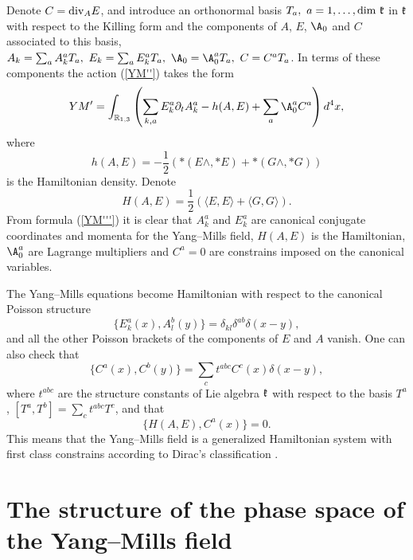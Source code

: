 \documentclass{amsart}
\begin{document}
Denote $C={\rm div}_A E$, and
introduce an orthonormal basis $T_a,~a=1,\ldots ,{\rm dim}~\mathfrak k $ in $\mathfrak k$ with respect to the
Killing form and the components of $A$, $E$, $\A_0$ and $C$ associated to this basis,
$A_k=\sum_a A_k^{a}T_a,~E_k=\sum_a
E_k^{a}T_a,~\A_0=\A_0^{a}T_a,~C=C^{a}T_a$. In terms of these components the
action (\ref{YM''}) takes the form
\begin{equation}\label{YM'''}
YM'=\int_{{\mathbb R}_{1,3}}\left( \sum_{k,a}E_k^{a}\partial_t A_k^{a}-h(A,E)+
\sum_{a}\A_0^{a}C^{a}\right) d^4x,
\end{equation}
where
$$
h(A,E)=-\frac 12 (*(E\wedge,*E)+*(G\wedge,*G))
$$
is the Hamiltonian density. Denote
\begin{equation}\label{hamilt}
H(A,E)=\frac 12 (\langle E,E\rangle +\langle G,G\rangle ).
\end{equation}
From formula (\ref{YM'''}) it is clear that $A_k^{a}$ and $E_k^{a}$ are
canonical conjugate coordinates and momenta for the Yang--Mills field,
$H(A,E)$ is the Hamiltonian, $\A_0^{a}$ are Lagrange multipliers and
$C^a=0$ are constrains imposed on the canonical variables.

The Yang--Mills equations become Hamiltonian with respect to the canonical Poisson
structure
\begin{equation}\label{pois}
  \{E_k^{a}(x),A_l^b(y)\}=\delta_{kl}\delta^{ab}\delta(x-y),
\end{equation}
and all the other Poisson brackets of the components of $E$ and $A$ vanish.
One can also check that
\begin{equation}\label{momentbrack}
\{C^a(x),C^b(y)\}=\sum_c t^{abc}C^c(x)\delta(x-y),
\end{equation}
where $t^{abc}$ are the structure constants of Lie algebra $\mathfrak k$ with respect
to the basis $T^a$, $[T^a,T^b]=\sum_c t^{abc}T^c$, and that
\begin{equation}\label{haminv}
\{H(A,E), C^a(x)\}=0.
\end{equation}
This means that the Yang--Mills field is a generalized Hamiltonian system
with first class constrains according to Dirac's classification \cite{Dir}.



\section{The structure of the phase space of the Yang--Mills field}\label{YMPh}
\end{document}
